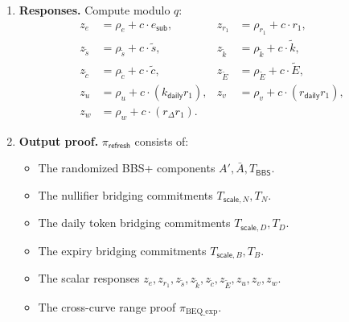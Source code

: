 \documentclass[11pt]{article}
\theoremstyle{definitionstyle}
\theoremstyle{plain}
\begin{document}
\begin{enumerate}[leftmargin=*]
\[\begin{array}{c}
  A' \parallel \bar{A} \parallel T_{\mathsf{BBS}} \parallel T_{\mathsf{scale},N} \parallel T_N \parallel T_{\mathsf{scale},D} \parallel T_D \parallel T_{\mathsf{scale},B} \parallel T_B \parallel \text{``Refresh''}
  \end{array}
  \right).
  \]
\item \textbf{Responses.}
  Compute modulo $q$:
  \begin{align*}
    z_e &= \rho_e + c \cdot e_{\mathsf{sub}}, & z_{r_1} &= \rho_{r_1} + c \cdot r_1, \\
    z_{\tilde{s}} &= \rho_{\tilde{s}} + c \cdot \tilde{s}, & z_{\tilde{k}} &= \rho_{\tilde{k}} + c \cdot \tilde{k}, \\
    z_{\tilde{c}} &= \rho_{\tilde{c}} + c \cdot \tilde{c}, & z_{\tilde{E}} &= \rho_{\tilde{E}} + c \cdot \tilde{E}, \\
    z_u &= \rho_u + c \cdot (k_{\mathsf{daily}} r_1), & z_v &= \rho_v + c \cdot (r_{\mathsf{daily}} r_1), \\
    z_w &= \rho_w + c \cdot (r_{\Delta} r_1).
  \end{align*}
\item \textbf{Output proof.}
  $\pi_{\mathsf{refresh}}$ consists of:
  \begin{itemize}[leftmargin=*, nosep]
  \item The randomized BBS+ components $A', \bar{A}, T_{\mathsf{BBS}}$.
  \item The nullifier bridging commitments $T_{\mathsf{scale},N}, T_N$.
  \item The daily token bridging commitments $T_{\mathsf{scale},D}, T_D$.
  \item The expiry bridging commitments $T_{\mathsf{scale},B}, T_B$.
  \item The scalar responses $z_e, z_{r_1}, z_{\tilde{s}}, z_{\tilde{k}}, z_{\tilde{c}}, z_{\tilde{E}}, z_u, z_v, z_w$.
  \item The cross-curve range proof $\pi_{\text{BEQ\_exp}}$.
  \end{itemize}
\end{enumerate}
\end{document}
